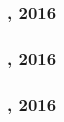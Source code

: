 \subsubsection{, 2016}
\paragraph{}

\subsubsection{, 2016}
\paragraph{}

\subsubsection{, 2016}
\paragraph{}